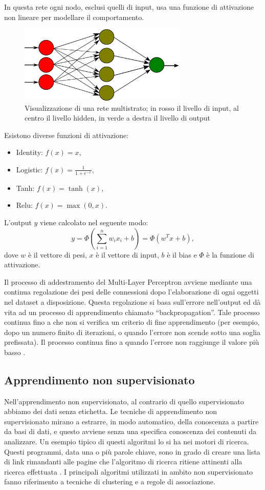 \documentclass[12pt,italian]{report}
\begin{document}
In questa rete ogni nodo, esclusi quelli di input, usa una funzione di attivazione non lineare per modellare il comportamento.

\begin{figure}[h]
	\centering
	\includegraphics[width = 80mm]{immagini/Multilayer-Perceptron}
	\caption{Visualizzazione di una rete multistrato; in rosso il livello di input, al centro il livello hidden, in verde a destra il livello di output}
\end{figure}
Esistono diverse funzioni di attivazione:
\begin{itemize}
	\item Identity: $f(x) = x$,
	\item Logistic: $f(x) = \frac{1}{1 + e^{-x}}$,
	\item Tanh: $f(x) = \tanh(x)$,
	\item Relu: $f(x) = \max(0, x)$.
\end{itemize}
L'output $y$ viene calcolato nel seguente modo: 
\begin{equation}
y = \Phi \left ( \sum_{i=1}^{n}w_ix_i + b \right ) = \Phi (w^{T}x + b),
\end{equation}
dove $w$ è il vettore di pesi, $x$ è il vettore di input, $b$ è il bias e $\Phi$ è la funzione di attivazione.

Il processo di addestramento del Multi-Layer Perceptron avviene mediante una continua regolazione dei pesi delle connessioni dopo l'elaborazione di ogni oggetti nel dataset a disposizione. Questa regolazione si basa sull'errore nell'output ed dà vita ad un processo di apprendimento chiamato ``backpropagation''. Tale processo continua fino a che non si verifica un criterio di fine apprendimento (per esempio, dopo un numero finito di iterazioni, o quando l'errore non scende sotto una soglia prefissata).
Il processo continua fino a quando l'errore non raggiunge il valore più basso \cite{multilayerPerceptron}.
\subsection{Apprendimento non supervisionato}
Nell’apprendimento non supervisionato, al contrario di quello supervisionato abbiamo dei dati senza etichetta. Le tecniche di apprendimento non supervisionato mirano a estrarre, in modo automatico, della conoscenza a partire da basi di dati, e questo avviene senza una specifica conoscenza dei contenuti da analizzare. Un esempio tipico di questi algoritmi lo si ha nei motori di ricerca. Questi programmi, data una o più parole chiave, sono in grado di creare una lista di link rimandanti alle pagine che l'algoritmo di ricerca ritiene attinenti alla ricerca effettuata \cite{unsupervisedlearning}.
I principali algoritmi utilizzati in ambito non supervisionato fanno riferimento a tecniche di clustering e a regole di associazione.
\end{document}
